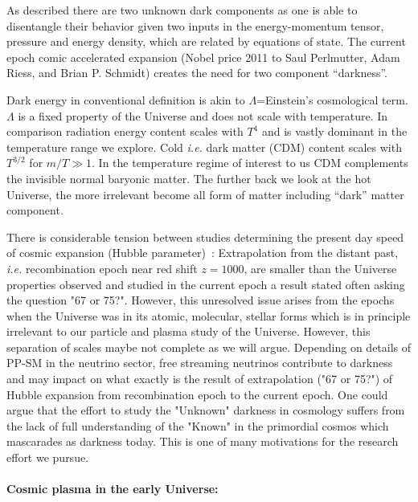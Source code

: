 As described there are two unknown dark components as one is able to disentangle their behavior given two inputs in the energy-momentum tensor, pressure and energy density, which are related by equations of state. The current epoch comic accelerated expansion (Nobel price 2011 to Saul Perlmutter, Adam Riess, and Brian P. Schmidt) creates the need for two component ``darkness''.

Dark energy in conventional definition is akin to $\Lambda$=Einstein's cosmological term. $\Lambda$ is a fixed property of the Universe and does not scale with temperature. In comparison radiation energy content scales with $T^4$ and is vastly dominant in the temperature range we explore. Cold {\it i.e.\/} dark matter (CDM) content scales with $T^{3/2}$ for $m/T\gg 1$. In the temperature regime of interest to us CDM complements the invisible normal baryonic matter. The further back we look at the hot Universe, the more irrelevant become all form of matter including ``dark'' matter component. 

There is considerable tension between studies determining the present day speed of cosmic expansion (Hubble parameter)~\cite{DiValentino:2024spr,DiValentino:2021izs}: Extrapolation from the distant past, {\it i.e.\/} recombination epoch near red shift $z=1000$, are smaller than the Universe properties observed and studied in the current epoch a result stated often asking the question "67 or 75?". However, this unresolved issue arises from the epochs when the Universe was in its atomic, molecular, stellar forms which is in principle irrelevant to our particle and plasma study of the Universe. However, this separation of scales maybe not complete as we will argue. Depending on details of PP-SM in the neutrino sector, free streaming neutrinos contribute to darkness and may impact on what exactly is the result of extrapolation ("67 or 75?") of Hubble expansion from recombination epoch to the current epoch. One could argue that the effort to study the "Unknown" darkness in cosmology suffers from the lack of full understanding of the "Known" in the primordial cosmos which mascarades as darkness today. This is one of many motivations for the research effort we pursue. 

 
\paragraph{Cosmic plasma in the early Universe:}

